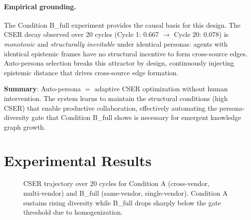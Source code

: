 \documentclass[12pt]{article}
\begin{document}
\paragraph{Empirical grounding.}
The Condition B\_full experiment provides the causal basis for this design.
The CSER decay observed over 20 cycles (Cycle 1: 0.667 $\to$ Cycle 20: 0.078)
is \emph{monotonic} and \emph{structurally inevitable} under identical personas:
agents with identical epistemic frames have no structural incentive to form
cross-source edges. Auto-persona selection breaks this attractor by design,
continuously injecting epistemic distance that drives cross-source edge formation.

\noindent\textbf{Summary}: Auto-persona $=$ adaptive CSER optimization without
human intervention. The system learns to maintain the structural conditions
(high CSER) that enable productive collaboration, effectively automating the
persona-diversity gate that Condition B\_full shows is necessary for emergent
knowledge graph growth.

\section{Experimental Results}

\begin{figure}[htbp]
\centering
{}
\caption{CSER trajectory over 20 cycles for Condition A (cross-vendor, multi-vendor) and B\_full (same-vendor, single-vendor). Condition A sustains rising diversity while B\_full drops sharply below the gate threshold due to homogenization.}
\label{fig:cser-timeseries}
\end{figure}
\end{document}
